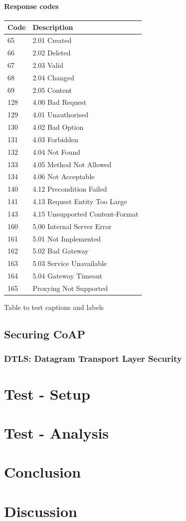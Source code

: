 \documentclass[11pt]{book}
\begin{document}
\subsubsection{Response codes}
\begin{center}
\begin{tabular}{ |p{3cm}|p{6cm}|  }
 \hline
 \textbf{Code} & \textbf{Description} \\
 \hline
 65 & 2.01 Created \\
 66 & 2.02  Deleted\\
 67 & 2.03 Valid\\
 68 & 2.04 Changed\\
 69 & 2.05  Content\\
 128 & 4.00  Bad Request\\
 129 & 4.01 Unauthorised\\
 130 & 4.02 Bad Option\\
 131 & 4.03 Forbidden\\
 132 & 4.04 Not Found\\
 133 & 4.05 Method Not Allowed\\
 134 & 4.06 Not Acceptable\\
 140 & 4.12 Precondition Failed\\
 141 & 4.13 Request Entity Too Large\\
 143 & 4.15 Unsupported Content-Format\\
 160 & 5.00 Internal Server Error\\
 161 & 5.01 Not Implemented\\
 162 & 5.02 Bad Gateway\\
 163 & 5.03 Service Unavailable\\
 164 & 5.04 Gateway Timeout\\
 165 & Proxying Not Supported\\
\hline
\end{tabular}
\caption{Table to test captions and labels}
\label{table:1}
\end{center}
\section{Securing CoAP}
\subsection{DTLS: Datagram Transport Layer Security}
\chapter{Test - Setup}
\chapter{Test - Analysis}
\chapter{Conclusion}
\chapter{Discussion}
\end{document}
